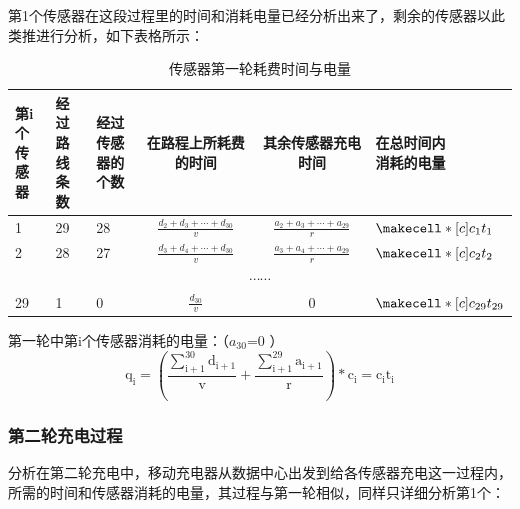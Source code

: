 \documentclass{article}
\begin{document}
第1个传感器在这段过程里的时间和消耗电量已经分析出来了，剩余的传感器以此类推进行分析，如下表格所示：
\vspace{1ex}
\begin{table}[h]
    \begin{center} 
        \begin{tabular}{|p{1.5cm}<{\centering}|p{1.5cm}<{\centering}|p{1.5cm}<{\centering}|c|c|p{2cm}<{\centering}|}
            \hline
            \makecell*[c]{第i个\\传感器} & \makecell*[c]{经过路\\线条数} & \makecell*[c]{经过传感\\器的个数}  & 在路程上所耗费的时间            & 其余传感器充电时间             & \makecell*[c]{在总时间内\\消耗的电量}  \\ 
            \hline
            1      & 29     & 28       & $\frac{d_{2}+d_{3}+\cdots+d_{30}}{v}$ & $\frac{a_{2}+a_{3}+\cdots+a_{29}}{r}$  &  $\makecell*[c]{c_1 t_1}$   \\ 
            \hline
            2      & 28     & 27       & $\frac{d_{3}+d_{4}+\cdots+d_{30}}{v}$ & $\frac{a_{3}+a_{4}+\cdots+a_{29}}{r}$  &  $\makecell*[c]{c_2 t_2}$  \\ 
            \hline
            \multicolumn{6}{|c|}{$\cdots \cdots$}                                                                 \\ 
            \hline
            29     & 1      & 0        & $\frac{d_{30}}{v}$     &  0  &  $\makecell*[c]{c_{29} t_{29}}$ \\
            \hline
        \end{tabular}
    \end{center}
\caption{传感器第一轮耗费时间与电量}
\end{table}

第一轮中第i个传感器消耗的电量：（$a_{30}$=0 ）
\begin{equation}
    \mathrm{q_i=\left(\frac{\sum_{i+1}^{30} d_{i+1}}{v}+\frac{\sum_{i+1}^{29} a_{i+1}}{r}\right) * c_i=c_i t_i}
    \tag{14}
\end{equation}

\subsubsection{第二轮充电过程}
分析在第二轮充电中，移动充电器从数据中心出发到给各传感器充电这一过程内，所需的时间和传感器消耗的电量，其过程与第一轮相似，同样只详细分析第1个：
\end{document}

